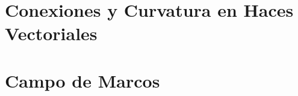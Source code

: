 \documentclass[10pt, letterpaper, spanish]{book}
\theoremstyle{definition}
\theoremstyle{plain}
\theoremstyle{remark}
\theoremstyle{break}
\begin{document}

\appendix

\chapter{Conexiones y Curvatura en Haces Vectoriales}


\chapter{Campo de Marcos}



\newpage




\printindex{}
\end{document}
